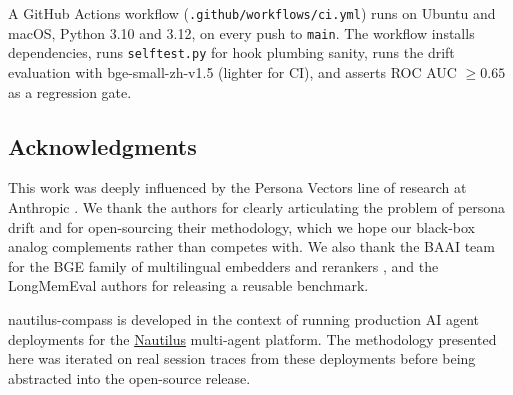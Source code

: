 A GitHub Actions workflow (\texttt{.github/workflows/ci.yml}) runs
on Ubuntu and macOS, Python 3.10 and 3.12, on every push to
\texttt{main}. The workflow installs dependencies, runs
\texttt{selftest.py} for hook plumbing sanity, runs the drift
evaluation with bge-small-zh-v1.5 (lighter for CI), and asserts
ROC AUC $\geq 0.65$ as a regression gate.

\subsection{Acknowledgments}
\label{sec:os-ack}

This work was deeply influenced by the Persona Vectors line of
research at Anthropic \citep{personavectors2025}. We thank the
authors for clearly articulating the problem of persona drift and
for open-sourcing their methodology, which we hope our black-box
analog complements rather than competes with. We also thank the
BAAI team for the BGE family of multilingual embedders and
rerankers \citep{bgem3, bgereranker}, and the LongMemEval authors
\citep{longmemeval2024} for releasing a reusable benchmark.

nautilus-compass is developed in the context of running production AI
agent deployments for the
\href{https://github.com/chunxiaoxx/nautilus}{Nautilus} multi-agent
platform. The methodology presented here was iterated on real
session traces from these deployments before being abstracted into
the open-source release.
